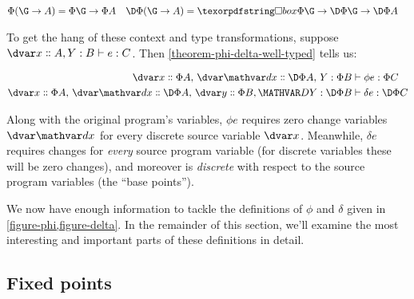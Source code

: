 \begin{align*}
  \Phi(\G \to A) &= \Phi\G \to \Phi A
  & \DP(\G \to A) &= \iso\Phi\G \to \DP\G \to \DP A
\end{align*}

\noindent
To get the hang of these context and type transformations, suppose $\J
e {\hd x A, \hm y B} C$. Then \cref{theorem-phi-delta-well-typed} tells us:

\begin{align*}
  \Jalign{\phi e} {\hd x{\Phi A},\, \hd \dx {\DP A},\, \hm y {\Phi B}} {\Phi C}
  \\
  \Jalign{\delta e} {\hd x{\Phi A},\, \hd\dx{\DP A},\, \hd y{\Phi B}, \hm\dy{\DP B}} {\DP C}
\end{align*}


\noindent
Along with the original program's variables, $\phi e$ requires zero change
variables $\dvar\dx$ for every discrete source variable $\dvar x$. Meanwhile,
$\delta e$ requires changes for \emph{every} source program variable (for
discrete variables these will be zero changes), and moreover is \emph{discrete}
with respect to the source program variables (the ``base points'').

We now have enough information to tackle the definitions of $\phi$ and $\delta$
given in \cref{figure-phi,figure-delta}. In the remainder of this section, we'll
examine the most interesting and important parts of these definitions in detail.


\subsection{Fixed points}

